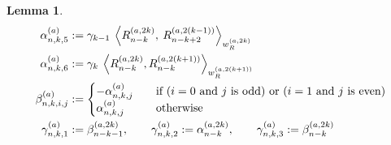 \documentclass[11pt, oneside]{article}   	%
\newcommand{\genjac}{R}
\newcommand{\genjacnmk}{\genjac_{n-k}}
\newcommand{\genjacw}{w_\genjac}
\newcommand{\alphaa}{\alpha^{(a)}}
\newcommand{\betaa}{\beta^{(a)}}
\newcommand{\gammaa}{\gamma^{(a)}}
\newtheorem{lemma}{Lemma}
\begin{document}
\begin{lemma}
\begin{align*}
	\alphaa_{n,k,5} &:= \gamma_{k-1} \: \ip<\genjacnmk^{(a, 2k)}, \: \genjac_{n-k+2}^{(a, 2(k-1))}>_{\genjacw^{(a, 2k)}} \\
	\alphaa_{n,k,6} &:=\gamma_{k} \: \ip<\genjacnmk^{(a, 2k)}, \genjacnmk^{(a, 2(k+1))}>_{\genjacw^{(a, 2(k+1))}} \\
	\betaa_{n,k,i,j} &:= 
		\begin{cases}
			- \alphaa_{n,k,j} \quad &\text{if }(i = 0 \text{ and } j \text{ is odd}) \text{ or }(i = 1 \text{ and } j \text{ is even}) \\
			\alphaa_{n,k,j} \quad &\text{otherwise}
		\end{cases} \\	
	\gammaa_{n,k,1} &:= \beta_{n-k-1}^{(a, 2k)}, \qquad \gammaa_{n,k,2} := \alpha_{n-k}^{(a, 2k)}, \qquad \gammaa_{n,k,3} := \beta_{n-k}^{(a, 2k)}
\end{align*}
\end{lemma}
\end{document}
